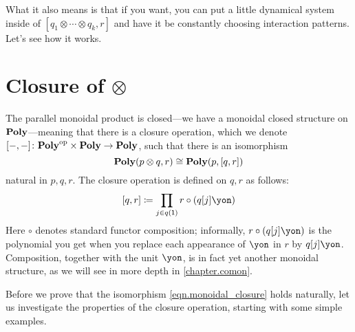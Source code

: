 \documentclass[Book-Poly]{subfiles}
\begin{document}
What it also means is that if you want, you can put a little dynamical system inside of $[q_1\otimes\cdots\otimes q_k,r]$ and have it be constantly choosing interaction patterns. Let's see how it works.


\section{Closure of $\otimes$}%

The parallel monoidal product is closed---we have a monoidal closed structure on $\mathbf{Poly}$---meaning that there is a closure operation, which we denote $[-,-]\colon\mathbf{Poly}^{\textnormal{op}}\times\mathbf{Poly}\to\mathbf{Poly}$, such that there is an isomorphism
\begin{equation}\label{eqn.monoidal_closure}
  \mathbf{Poly}(p\otimes q,r) \cong \mathbf{Poly}(p,[q,r])
\end{equation}
natural in $p,q,r$.
The closure operation is defined on $q,r$ as follows:
\begin{equation}\label{eqn.dir_hom}
	\ihom{q,r} \coloneqq \prod_{j\in q(\1)}r\circ(q[j]\yon)
\end{equation}
Here $\circ$ denotes standard functor composition; informally, $r \circ (q[j]\yon)$ is the polynomial you get when you replace each appearance of $\yon$ in $r$ by $q[j]\yon$.
Composition, together with the unit $\yon$, is in fact yet another monoidal structure, as we will see in more depth in \cref{chapter.comon}.

Before we prove that the isomorphism \eqref{eqn.monoidal_closure} holds naturally, let us investigate the properties of the closure operation, starting with some simple examples.
\end{document}
